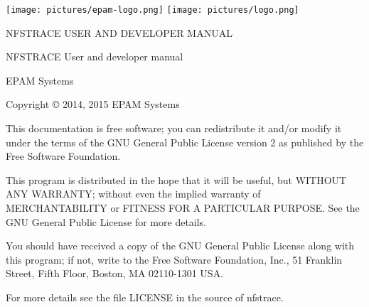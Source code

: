\documentclass[oneside]{article}
\begin{document}

\begin{titlepage}

\newcommand{\HRule}{\rule{\linewidth}{0.5mm}} %

\texttt{[image: pictures/epam-logo.png]}
\newline
\center
\vspace{3cm}
\texttt{[image: pictures/logo.png]}

\par\vspace{1cm}
\center
{\huge NFSTRACE USER AND DEVELOPER MANUAL}\\[0.4cm] %
{} 
\vfill 
\end{titlepage} 


\newpage

\vspace{5mm}
NFSTRACE User and developer manual 

\vspace{5mm}
EPAM Systems 

\vspace{5mm}
Copyright © 2014, 2015 EPAM Systems 

\vspace{5mm} This documentation is free software; you can redistribute it
and/or modify it under the terms of the GNU General Public License version 2 as
published by the Free Software Foundation.  

\vspace{5mm} This program is distributed in the hope that it will be useful,
but WITHOUT ANY WARRANTY; without even the implied warranty of MERCHANTABILITY
or FITNESS FOR A PARTICULAR PURPOSE. See the GNU General Public License for
more details.

\vspace{5mm} You should have received a copy of the GNU General Public License
along with this program; if not, write to the Free Software Foundation, Inc.,
51 Franklin Street, Fifth Floor, Boston, MA 02110-1301 USA.

\vspace{5mm} For more details see the file LICENSE in the source of nfstrace.
\end{document}
